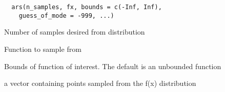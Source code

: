 \documentclass[a4paper]{book}
\begin{document}
%
\begin{Usage}
\begin{verbatim}
  ars(n_samples, fx, bounds = c(-Inf, Inf),
    guess_of_mode = -999, ...)
\end{verbatim}
\end{Usage}
%
\begin{Arguments}
\begin{ldescription}
\item[\code{n\_samples:}] Number of samples desired from
distribution

\item[\code{fx:}] Function to sample from

\item[\code{bounds:}] Bounds of function of interest.  The
default is an unbounded function
\end{ldescription}
\end{Arguments}
%
\begin{Value}
a vector containing  points sampled from the f(x)
distribution
\end{Value}
\end{document}
